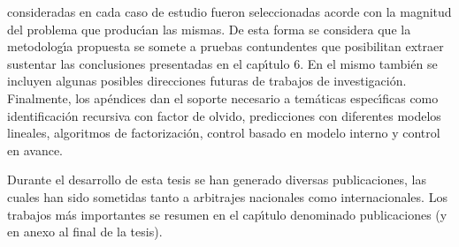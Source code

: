 consideradas en cada caso de estudio fueron seleccionadas acorde con la magnitud del problema que produc{\'\i}an
las mismas. De esta forma se considera que la metodolog{\'\i}a propuesta se somete a pruebas contundentes que
posibilitan extraer sustentar las conclusiones presentadas en el cap{\'\i}tulo 6. En el mismo tambi{\'e}n se incluyen
algunas posibles direcciones futuras de trabajos de investigaci{\'o}n. Finalmente, los ap{\'e}ndices dan el soporte
necesario a tem{\'a}ticas espec{\'\i}ficas como identificaci{\'o}n recursiva con factor de olvido, predicciones con
diferentes modelos lineales, algoritmos de factorizaci{\'o}n, control basado en modelo interno y control en
avance.

Durante el desarrollo de esta tesis se han generado diversas publicaciones, las cuales han sido sometidas tanto a arbitrajes nacionales como
internacionales. Los trabajos m{\'a}s importantes se resumen en el cap{\'\i}tulo denominado publicaciones (y en anexo al final de la tesis).
